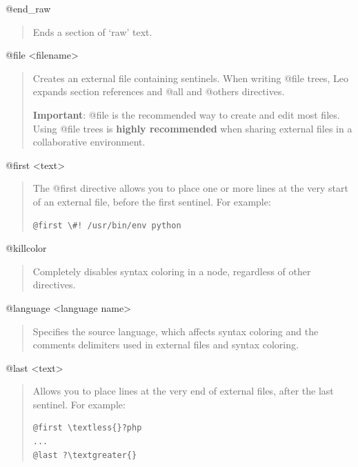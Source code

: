 \documentclass[a4paper,10pt,english]{sphinxmanual}
\begin{document}
@end\_raw
\begin{quote}

Ends a section of `raw' text.
\end{quote}

@file \textless{}filename\textgreater{}
\begin{quote}

Creates an external file containing sentinels. When writing @file
trees, Leo expands section references and @all and @others directives.

\textbf{Important}: @file is the recommended way to create and edit most files.
Using @file trees is \textbf{highly recommended} when sharing external files in
a collaborative environment.
\end{quote}

@first \textless{}text\textgreater{}
\begin{quote}

The @first directive allows you to place one or more lines at the very start of an
external file, before the first sentinel. For example:

\begin{Verbatim}[commandchars=\\\{\}]
@first \#! /usr/bin/env python
\end{Verbatim}
\end{quote}

@killcolor
\begin{quote}

Completely disables syntax coloring in a node, regardless of other directives.
\end{quote}

@language \textless{}language name\textgreater{}
\begin{quote}

Specifies the source language, which affects syntax coloring and the
comments delimiters used in external files and syntax coloring.
\end{quote}

@last \textless{}text\textgreater{}
\begin{quote}

Allows you to place lines at the very end of external files, after the last
sentinel. For example:

\begin{Verbatim}[commandchars=\\\{\}]
@first \textless{}?php
...
@last ?\textgreater{}
\end{Verbatim}
\end{quote}
\end{document}
